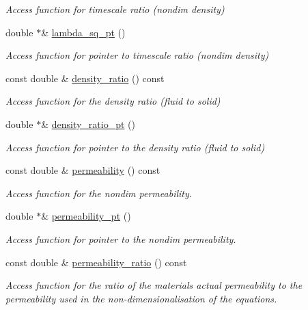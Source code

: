 \begin{DoxyCompactItemize}
\begin{DoxyCompactList}\small\item\em Access function for timescale ratio (nondim density) \end{DoxyCompactList}\item 
double $\ast$\& \hyperlink{classoomph_1_1AxisymmetricPoroelasticityEquations_a2442bdcf91f689440f9a5b622ea9ba0b}{lambda\+\_\+sq\+\_\+pt} ()
\begin{DoxyCompactList}\small\item\em Access function for pointer to timescale ratio (nondim density) \end{DoxyCompactList}\item 
const double \& \hyperlink{classoomph_1_1AxisymmetricPoroelasticityEquations_a96584beacdd7c3b3b248f2ea8e016731}{density\+\_\+ratio} () const
\begin{DoxyCompactList}\small\item\em Access function for the density ratio (fluid to solid) \end{DoxyCompactList}\item 
double $\ast$\& \hyperlink{classoomph_1_1AxisymmetricPoroelasticityEquations_a54c0959b5f478e7d48725ab516d950bb}{density\+\_\+ratio\+\_\+pt} ()
\begin{DoxyCompactList}\small\item\em Access function for pointer to the density ratio (fluid to solid) \end{DoxyCompactList}\item 
const double \& \hyperlink{classoomph_1_1AxisymmetricPoroelasticityEquations_ab52dc140cfce886743c584c2bae82548}{permeability} () const
\begin{DoxyCompactList}\small\item\em Access function for the nondim permeability. \end{DoxyCompactList}\item 
double $\ast$\& \hyperlink{classoomph_1_1AxisymmetricPoroelasticityEquations_a4309befdee5285a1c04636b50401eca8}{permeability\+\_\+pt} ()
\begin{DoxyCompactList}\small\item\em Access function for pointer to the nondim permeability. \end{DoxyCompactList}\item 
const double \& \hyperlink{classoomph_1_1AxisymmetricPoroelasticityEquations_a4c777d0a0a82afa9342cca27609b0049}{permeability\+\_\+ratio} () const
\begin{DoxyCompactList}\small\item\em Access function for the ratio of the material\textquotesingle{}s actual permeability to the permeability used in the non-\/dimensionalisation of the equations. \end{DoxyCompactList}\item 

\end{DoxyCompactItemize}
